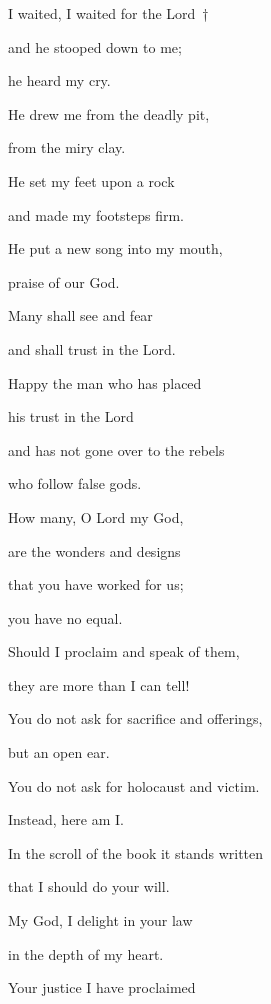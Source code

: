 \noindent I waited, I waited for the Lord~†~\nopagebreak

and he stooped down to me;~\GreStar{}~\nopagebreak

he heard my cry.

\noindent He drew me from the deadly pit,~\GreStar{}~\nopagebreak

from the miry clay.

\noindent He set my feet upon a rock~\GreStar{}~\nopagebreak

and made my footsteps firm.

\noindent He put a new song into my mouth,~\GreStar{}~\nopagebreak

praise of our God.

\noindent Many shall see and fear~\GreStar{}~\nopagebreak

and shall trust in the Lord.

\noindent Happy the man who has placed~\GreStar{}~\nopagebreak

his trust in the Lord

\noindent and has not gone over to the rebels~\GreStar{}~\nopagebreak

who follow false gods.

\noindent How many, O Lord my God,~\GreStar{}~\nopagebreak

are the wonders and designs 

\noindent that you have worked for us;~\GreStar{}~\nopagebreak

you have no equal.

\noindent Should I proclaim and speak of them,~\GreStar{}~\nopagebreak

they are more than I can tell!

\noindent You do not ask for sacrifice and offerings,~\GreStar{}~\nopagebreak

but an open ear.

\noindent You do not ask for holocaust and victim.~\GreStar{}~\nopagebreak

Instead, here am I.

\noindent In the scroll of the book it stands written~\GreStar{}~\nopagebreak

that I should do your will.

\noindent My God, I delight in your law~\GreStar{}~\nopagebreak

in the depth of my heart.

\noindent Your justice I have proclaimed~\GreStar{}~\nopagebreak

